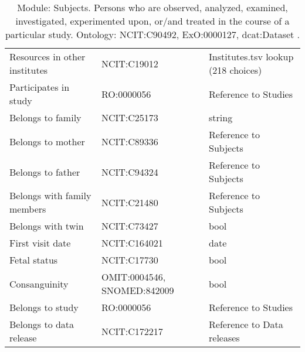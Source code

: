\documentclass{article}
\begin{document}
\begin{table}[htb]
\begin{tabular}{lll}
Resources in other institutes & NCIT:C19012  & Institutes.tsv lookup (218 choices) \\
Participates in study & RO:0000056  & Reference to Studies \\
Belongs to family & NCIT:C25173  & string \\
Belongs to mother & NCIT:C89336  & Reference to Subjects \\
Belongs to father & NCIT:C94324  & Reference to Subjects \\
Belongs with family members & NCIT:C21480  & Reference to Subjects \\
Belongs with twin & NCIT:C73427  & bool \\
First visit date & NCIT:C164021  & date \\
Fetal status & NCIT:C17730  & bool \\
Consanguinity & OMIT:0004546, SNOMED:842009  & bool \\
Belongs to study & RO:0000056  & Reference to Studies \\
Belongs to data release & NCIT:C172217  & Reference to Data releases \\
\hline
\end{tabular}
\caption[Module: Subjects]{\label{table:table4} Module: Subjects. Persons who are observed, analyzed, examined, investigated, experimented upon, or/and treated in the course of a particular study. Ontology: NCIT:C90492, ExO:0000127, dcat:Dataset . }
\end{table}
\end{document}
